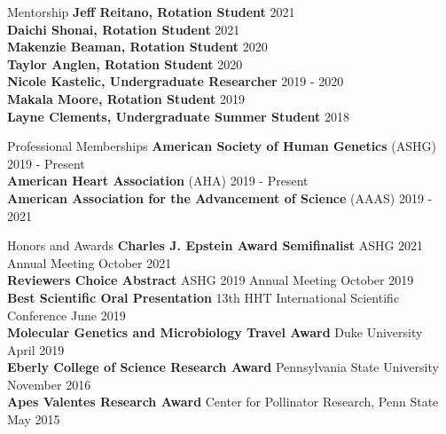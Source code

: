 \documentclass{resume} %
\begin{document}
\begin{rSection}{Mentorship}
{\bf Jeff Reitano, Rotation Student} \hfill {2021}\\
{\bf Daichi Shonai, Rotation Student} \hfill {2021}\\
{\bf Makenzie Beaman, Rotation Student} \hfill {2020}\\
{\bf Taylor Anglen, Rotation Student} \hfill {2020}\\
{\bf Nicole Kastelic, Undergraduate Researcher} \hfill {2019 - 2020}\\
{\bf Makala Moore, Rotation Student} \hfill {2019}\\
{\bf Layne Clements, Undergraduate Summer Student} \hfill {2018}\\

\end{rSection}


\begin{rSection}{Professional Memberships}
{\bf American Society of Human Genetics} (ASHG)  \hfill {2019 - Present} \\ 
{\bf American Heart Association} (AHA) \hfill {2019 - Present} \\ 
{\bf American Association for the Advancement of Science} (AAAS) \hfill {2019 - 2021} \\
\end{rSection}


\begin{rSection}{Honors and Awards}
{\bf Charles J. Epstein Award Semifinalist} ASHG 2021 Annual Meeting \hfill {October 2021} \\ 
{\bf Reviewers Choice Abstract} ASHG 2019 Annual Meeting \hfill {October 2019} \\ 
{\bf Best Scientific Oral Presentation} 13th HHT International Scientific Conference \hfill {June 2019} \\ 
{\bf Molecular Genetics and Microbiology Travel Award} Duke University \hfill {April 2019} \\ 
{\bf Eberly College of Science Research Award} Pennsylvania State University \hfill {November 2016} \\ 
{\bf Apes Valentes Research Award} Center for Pollinator Research, Penn State \hfill {May 2015} 
\end{rSection}
\end{document}
